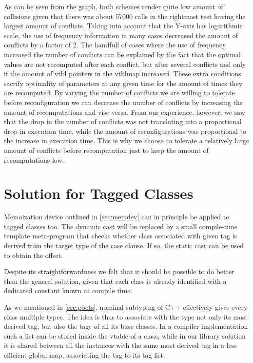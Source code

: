\documentclass[preprint]{sigplanconf}
\begin{document}
As can be seen from the graph, both schemes render quite low amount of 
collisions given that there was about 57000 calls in the rightmost test having 
the largest amount of conflicts. Taking into account that the Y-axis has 
logarithmic scale, the use of frequency information in many cases decreased the 
amount of conflicts by a factor of 2. The handfull of cases where the use of 
frequency increased the number of conflicts can be explained by the fact that 
the optimal values are not recomputed after each conflict, but after several 
conflicts and only if the amount of vtbl pointers in the vtblmap increased. These 
extra conditions sacrify optimality of parameters at any given time for the amount 
of times they are recomputed. By varying the number of conflicts we are willing 
to tolerate before reconfiguration we can decrease the number of conflicts by 
increasing the amount of recomputations and vise versa. From our experience, 
however, we saw that the drop in the number of conflicts was not translating 
into a proportional drop in execution time, while the amount of reconfigurations 
was proportional to the increase in execution time. This is why we choose to 
tolerate a relatively large amount of conflicts before recomputation just to 
keep the amount of recomputations low.

\section{Solution for Tagged Classes}
\label{sec:cotc}

Memoization device outlined in \textsection\ref{sec:memdev} can in principle be 
applied to tagged classes too. The dynamic cast will be replaced by a small 
compile-time template meta-program that checks whether class associated with 
given tag is derived from the target type of the case clause. If so, the static 
cast can be used to obtain the offset.

Despite its straightforwardness we felt that it should be possible to do better 
than the general solution, given that each class is already identified with a 
dedicated constant known at compile time.

As we mentioned in \textsection\ref{sec:poets}, nominal subtyping of C++ 
effectively gives every class multiple types. The idea is thus to associate with 
the type not only its most derived tag, but also the tags of all its base classes.
In a compiler implementation such a list can be stored inside the vtable of a 
class, while in our library solution it is shared between all the instances with 
the same most derived tag in a less efficient global map, associating the tag to 
its tag list.
\end{document}
